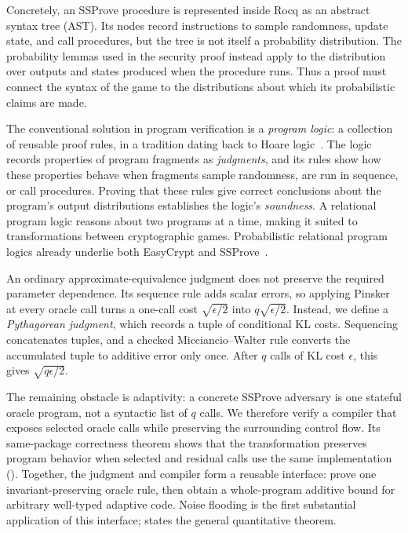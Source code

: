 Concretely, an SSProve procedure is represented inside Rocq as an abstract
syntax tree (AST).
Its nodes record instructions to sample randomness, update state, and call
procedures, but the tree is not itself a probability distribution.
The probability lemmas used in the security proof instead apply to the
distribution over outputs and states produced when the procedure runs.
Thus a proof must connect the syntax of the game to the distributions about
which its probabilistic claims are made.

The conventional solution in program verification is a \emph{program logic}: a
collection of reusable proof rules, in a tradition dating back to Hoare
logic~\cite{hoare69}.
The logic records properties of program fragments as \emph{judgments}, and its
rules show how these properties behave when fragments sample randomness, are
run in sequence, or call procedures.
Proving that these rules give correct conclusions about the program's output distributions
establishes the logic's \emph{soundness}.
A relational program logic reasons about two programs at a time, making it
suited to transformations between cryptographic games.
Probabilistic relational program logics already underlie both EasyCrypt and
SSProve~\cite{easycrypt,ssprove}.

An ordinary approximate-equivalence judgment does not preserve the required parameter dependence.
Its sequence rule adds scalar errors, so applying Pinsker at every oracle call turns a one-call cost \(\sqrt{\epsilon/2}\) into \(q\sqrt{\epsilon/2}\).
Instead, we define a \emph{Pythagorean judgment}, which records a tuple of conditional KL costs.
Sequencing concatenates tuples, and a checked Micciancio--Walter rule converts the accumulated tuple to additive error only once.
After \(q\) calls of KL cost \(\epsilon\), this gives \(\sqrt{q\epsilon/2}\).

The remaining obstacle is adaptivity: a concrete SSProve adversary is one stateful oracle program, not a syntactic list of \(q\) calls.
We therefore verify a compiler that exposes selected oracle calls while
preserving the surrounding control flow.  Its same-package correctness theorem
shows that the transformation preserves program behavior when selected and
residual calls use the same implementation ().
Together, the judgment and compiler form a reusable interface: prove one
invariant-preserving oracle rule, then obtain a whole-program additive bound
for arbitrary well-typed adaptive code.
Noise flooding is the first substantial application of this interface;
 states the general quantitative theorem.

